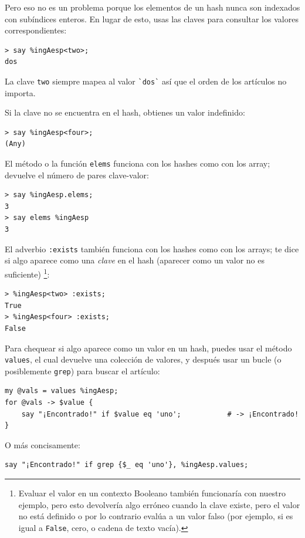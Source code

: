 Pero eso no es un problema porque los elementos de un hash
nunca son indexados con subíndices enteros. En lugar de esto,
usas las claves para consultar los valores correspondientes:

\begin{verbatim}
> say %ingAesp<two>;
dos
\end{verbatim}
%
La clave \verb"two" siempre mapea al valor \verb|`dos`|
así que el orden de los artículos no importa.

Si la clave no se encuentra en el hash, obtienes un valor 
indefinido:

\begin{verbatim}
> say %ingAesp<four>;
(Any)
\end{verbatim}
%
El método o la función {\tt elems} funciona con los hashes
como con los array; devuelve el número de pares clave-valor:


\begin{verbatim}
> say %ingAesp.elems;
3
> say elems %ingAesp
3
\end{verbatim}
%
El adverbio {\tt :exists} también funciona con los hashes 
como con los arrays; te dice si algo aparece como una 
{\em clave} en el hash (aparecer como un valor no es suficiente)
\footnote{Evaluar el valor en un contexto Booleano también 
funcionaría con nuestro ejemplo, pero esto devolvería
algo erróneo cuando la clave existe, pero el valor 
no está definido o por lo contrario evalúa a un valor falso
(por ejemplo, si es igual a {\tt False}, cero, o 
cadena de texto vacía).}:

\begin{verbatim}
> %ingAesp<two> :exists;
True
> %ingAesp<four> :exists;
False
\end{verbatim}
%
Para chequear si algo aparece como un valor en un hash, 
puedes usar el método {\tt values}, el cual devuelve una 
colección de valores, y después usar un bucle (o posiblemente 
{\tt grep}) para buscar el artículo:

\begin{verbatim}
my @vals = values %ingAesp;
for @vals -> $value {
    say "¡Encontrado!" if $value eq 'uno';           # -> ¡Encontrado!
}
\end{verbatim}
%
O más concisamente:
\begin{verbatim}
say "¡Encontrado!" if grep {$_ eq 'uno'}, %ingAesp.values;
\end{verbatim}

